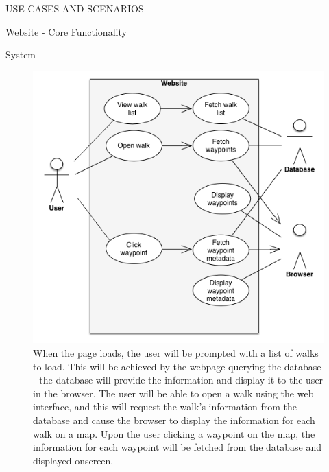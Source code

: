 \documentclass{article}
\begin{document}
\begin{section}{USE CASES AND SCENARIOS}
		\clearpage
		\begin{subsection}{Website - Core Functionality}
			\begin{subsubsection}{System}
				\begin{figure}[h!]
					\begin{center}
						\includegraphics[height=0.75\columnwidth]{images/UseCase/Website/Core/Website.png}
					\end{center}
					\caption{When the page loads, the user will be prompted with a list of walks to load. This will be achieved by the webpage querying the database - the database will provide the information and display it to the user in the browser. The user will be able to open a walk using the web interface, and this will request the walk's information from the database and cause the browser to display the information for each walk on a map. Upon the user clicking a waypoint on the map, the information for each waypoint will be fetched from the database and displayed onscreen.}
				\end{figure}
			\end{subsubsection}
		\end{subsection}
		

\end{section}
\end{document}
